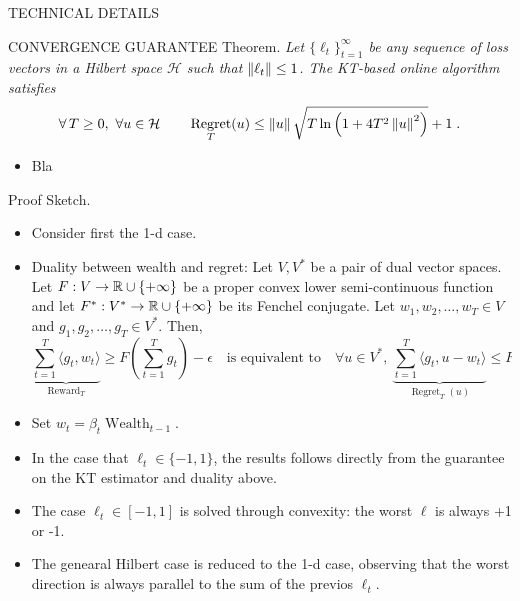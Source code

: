 \documentclass[final,t,serif,mathserif]{beamer}
\DeclareMathOperator{\Wealth}{Wealth}
\renewcommand{\H}{\mathcal{H}}  %
\DeclareMathOperator{\Regret}{Regret}
\DeclareMathOperator{\Reward}{Reward}
\def\spaziooo{\vspace{-0.cm}}
\begin{document}
\begin{frame}{}
\begin{columns}[t]
\begin{column}{.33\linewidth}
\begin{block}{TECHNICAL DETAILS}
\begin{minipage}{.98\linewidth}
    \begin{block}{CONVERGENCE GUARANTEE}
    \spaziooo
    \alert{Theorem.} \emph{
	Let $\{\ell_t\}_{t=1}^\infty$ be any sequence of loss vectors
	in a Hilbert space $\H$ such that $\left\|{\ell_t}\right\| \le 1$.
	The KT-based online algorithm satisfies
	$$
	\forall \, T \ge 0, \
	\forall u \in \H \qquad
	\Regret_T(u) \le \norm{u} \sqrt{T \ln\left(1 + 4T^2 \norm{u}^2 \right)} + 1 \;.
	$$
    }
    \vspace{1cm}
    \begin{itemize}
    \item Bla
    \end{itemize}
    \vspace{.5cm}
    \alert{Proof Sketch.}
    \begin{itemize}
    \item Consider first the 1-d case.
    \item Duality between wealth and regret: Let $V,V^*$ be a pair of dual vector spaces. Let $F:V \to \mathbb{R} \cup \{+\infty\}$ be a proper convex lower semi-continuous function and let $F^*:V^* \to \mathbb{R} \cup \{+\infty\}$ be its Fenchel conjugate. Let $w_1, w_2, \dots, w_T \in V$ and $g_1, g_2, \dots, g_T \in V^*$.  Then,
    \[
      \underbrace{\sum_{t=1}^T \langle g_t, w_t \rangle}_{\Reward_T} \ge F\left( \sum_{t=1}^T g_t \right) -\epsilon
      \quad \text{is equivalent to} \quad
      \forall u \in V^*, \
      \underbrace{\sum_{t=1}^T \langle g_t, u - w_t\rangle}_{\Regret_T(u)} \le F^*(u) + \epsilon\; .
    \]
    \item Set $w_t=\beta_t \Wealth_{t-1}$.
    \item In the case that $\ell_t \in \{-1,1\}$, the results follows directly from the guarantee on the KT estimator and duality above.
    \item The case $\ell_t \in [-1,1]$ is solved through convexity: the worst $\ell$ is always +1 or -1.
    \item The genearal Hilbert case is reduced to the 1-d case, observing that the worst direction is always parallel to the sum of the previos $\ell_t$.
    \end{itemize}    
    \spaziooo
    \end{block}
    \end{minipage}
    \end{block}

    
  \end{column}
\end{columns}
\end{frame}
\end{document}
